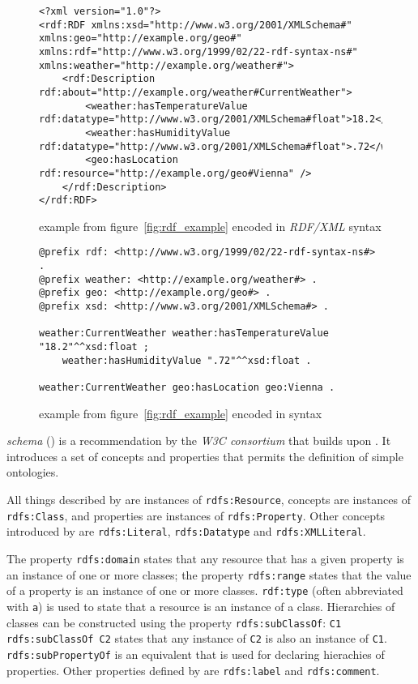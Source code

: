 \begin{figure} %
\begin{lstlisting}
<?xml version="1.0"?>
<rdf:RDF xmlns:xsd="http://www.w3.org/2001/XMLSchema#" xmlns:geo="http://example.org/geo#" xmlns:rdf="http://www.w3.org/1999/02/22-rdf-syntax-ns#" xmlns:weather="http://example.org/weather#">
	<rdf:Description rdf:about="http://example.org/weather#CurrentWeather">
		<weather:hasTemperatureValue rdf:datatype="http://www.w3.org/2001/XMLSchema#float">18.2</weather:hasTemperatureValue>
		<weather:hasHumidityValue rdf:datatype="http://www.w3.org/2001/XMLSchema#float">.72</weather:hasHumidityValue>
		<geo:hasLocation rdf:resource="http://example.org/geo#Vienna" />
	</rdf:Description>
</rdf:RDF>
\end{lstlisting}
\caption{ example from figure~\ref{fig:rdf_example} encoded in \emph{RDF/XML} syntax}
\label{fig:rdfxml_example}
\end{figure}

\begin{figure}
\begin{lstlisting}
@prefix rdf: <http://www.w3.org/1999/02/22-rdf-syntax-ns#> .
@prefix weather: <http://example.org/weather#> .
@prefix geo: <http://example.org/geo#> .
@prefix xsd: <http://www.w3.org/2001/XMLSchema#> .

weather:CurrentWeather weather:hasTemperatureValue "18.2"^^xsd:float ;
    weather:hasHumidityValue ".72"^^xsd:float .

weather:CurrentWeather geo:hasLocation geo:Vienna .
\end{lstlisting}
\caption{ example from figure~\ref{fig:rdf_example} encoded in  syntax}
\label{fig:turtle_example}
\end{figure}

 \emph{schema} () is a recommendation by the \emph{W3C consortium} that builds upon . It introduces a set of concepts and properties that permits the definition of simple ontologies. 

All things described by  are instances of \texttt{rdfs:Resource}, concepts are instances of \texttt{rdfs:Class}, and properties are instances of \texttt{rdfs:Property}. Other concepts introduced by  are \texttt{rdfs:Literal}, \texttt{rdfs:Datatype} and \texttt{rdfs:XMLLiteral}.

The property \texttt{rdfs:domain} states that any resource that has a given property is an instance of one or more classes; the property \texttt{rdfs:range} states that the value of a property is an instance of one or more classes. \texttt{rdf:type} (often abbreviated with \texttt{a}) is used to state that a resource is an instance of a class. Hierarchies of classes can be constructed using the property \texttt{rdfs:subClassOf}: \texttt{C1 rdfs:subClassOf C2} states that any instance of \texttt{C2} is also an instance of \texttt{C1}. \texttt{rdfs:subPropertyOf} is an equivalent that is used for declaring hierachies of properties. Other properties defined by  are \texttt{rdfs:label} and \texttt{rdfs:comment}.

